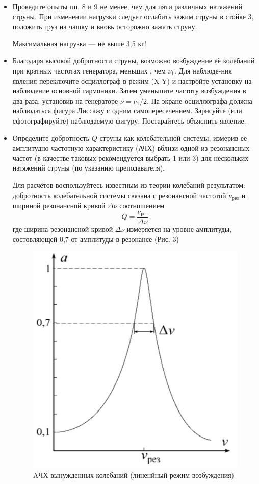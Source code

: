 \documentclass[a4paper,12pt]{article} %
\begin{document}
\begin{itemize}
\item Проведите опыты пп. 8 и 9 не менее, чем для пяти различных натяжений струны. При изменении нагрузки следует ослабить зажим струны в стойке 3, положить груз на чашку и вновь осторожно зажать струну.

Максимальная нагрузка — не выше 3,5 кг!

\item Благодаря высокой добротности струны, возможно возбуждение её колебаний при кратных частотах генератора, меньших , чем $\nu_1$. Для наблюде-ния явления переключите осциллограф в режим (X-Y) и настройте установку на наблюдение основной гармоники. Затем уменьшите частоту возбуждения в	два раза, установив на генераторе $\nu = \nu_1/2$. На экране осциллографа должна наблюдаться фигура Лиссажу с одним самопересечением. Зарисуйте (или сфотографируйте) наблюдаемую фигуру. Постарайтесь объяснить явление.

\item Определите добротность $Q$ струны как колебательной системы, измерив её амплитудно-частотную характеристику (АЧХ) вблизи одной из резонансных частот (в качестве таковых рекомендуется выбрать 1 или 3) для нескольких натяжений струны (по указанию преподавателя).

Для расчётов воспользуйтесь известным из теории колебаний результатом: добротность колебательной системы связана с резонансной частотой $\nu_\text{рез}$ и шириной резонансной кривой $\Delta \nu$    соотношением
\[Q = \frac{\nu_\text{рез}}{\Delta \nu}\]
где ширина резонансной кривой $\Delta \nu$ измеряется на уровне амплитуды, состовляющей 0,7 от амплитуды в резонансе (Рис. 3)
\begin{figure}[h]
\centering
\includegraphics[scale=0.5]{3}
\caption{AЧХ вынужденных колебаний (линенйный режим возбуждения)}
\end{figure}


\end{itemize}
\end{document}
